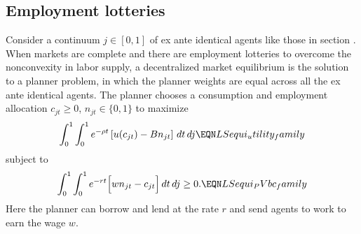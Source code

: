 






\subsection{Employment lotteries}\label{sec:LS_lottery}%
Consider a continuum $j \in [0,1]$ of ex ante identical agents like
those in section . When markets are complete
and there are employment lotteries to overcome the nonconvexity in
labor supply, a decentralized market equilibrium is the solution to
a planner problem, in which the planner weights are
equal across all the ex ante identical agents. The planner chooses
a consumption and employment allocation $c_{jt}\geq 0$,
$n_{jt}\in\{0,1\}$ to maximize
$$
\int_0^1 \int_0^1 e^{-\rho t} \left[u(c_{jt}) - B n_{jt}
                                               \right]\,dt\,dj
\EQN LSequi_utility_family
$$
subject to
$$
\int_0^1 \int_0^1 e^{-r t} \Bigl[w n_{jt} - c_{jt}
                                          \Bigr]\,dt\,dj \geq 0.
\EQN LSequi_PVbc_family
$$
Here the planner can borrow and lend at the rate $r$
and send agents to work to earn the wage $w$.

